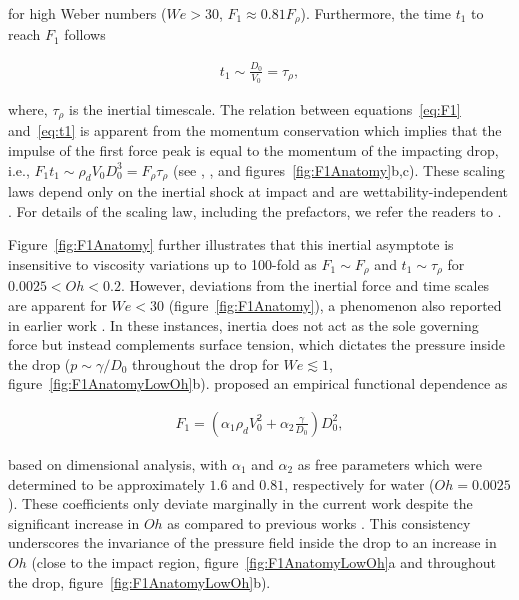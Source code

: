 \documentclass{jfm}
\newcommand{\Wen}{\mathit{We}}
\begin{document}
	\noindent for high Weber numbers ($\Wen > 30$, $F_1 \approx 0.81F_\rho$). Furthermore, the time $t_1$ to reach $F_1$ follows 
	
	\begin{align}\label{eq:t1}
		t_1 \sim \frac{D_0}{V_0} = \tau_\rho,
	\end{align}
	
	\noindent where, $\tau_\rho$ is the inertial timescale. The relation between equations~\eqref{eq:F1} and~\eqref{eq:t1} is apparent from the momentum conservation which implies that the impulse of the first force peak is equal to the momentum of the impacting drop, i.e., $F_1t_1 \sim \rho_dV_0D_0^3 = F_\rho\tau_\rho$ (see \citealp{Gordillo2018}, \citealp{zhang2022impact}, and figures~\ref{fig:F1Anatomy}b,c). These scaling laws depend only on the inertial shock at impact and are wettability-independent \citep{Zhang2017, Gordillo2018, zhang2022impact}. For details of the scaling law, including the prefactors, we refer the readers to \citet{Philippi2016, Gordillo2018, cheng2021drop}. 
	
	Figure~\ref{fig:F1Anatomy} further illustrates that this inertial asymptote is insensitive to viscosity variations up to 100-fold as $F_1 \sim F_\rho$ and $t_1 \sim \tau_\rho$ for $0.0025 < Oh < 0.2$. However, deviations from the inertial force and time scales are apparent for $\Wen < 30$ (figure~\ref{fig:F1Anatomy}), a phenomenon also reported in earlier work \citep{Soto2014, zhang2022impact}. In these instances, inertia does not act as the sole governing force but instead complements surface tension, which dictates the pressure inside the drop ($p \sim \gamma/D_0$ throughout the drop for $We \lesssim 1$, figure~\ref{fig:F1AnatomyLowOh}b). \citet{zhang2022impact} proposed an empirical functional dependence as
	
	\begin{align}
		F_1 = \left(\alpha_1\rho_d V_0^2 + \alpha_2\frac{\gamma}{D_0}\right)D_0^2,
	\end{align}
	
	\noindent based on dimensional analysis, with $\alpha_1$ and $\alpha_2$ as free parameters which were determined to be approximately $1.6$ and $0.81$, respectively for water ($Oh = 0.0025$). These coefficients only deviate marginally in the current work despite the significant increase in $Oh$ as compared to previous works \citep{cheng2021drop, zhang2022impact}. This consistency underscores the invariance of the pressure field inside the drop to an increase in $Oh$ (close to the impact region, figure~\ref{fig:F1AnatomyLowOh}a and throughout the drop, figure~\ref{fig:F1AnatomyLowOh}b).
	
\end{document}
